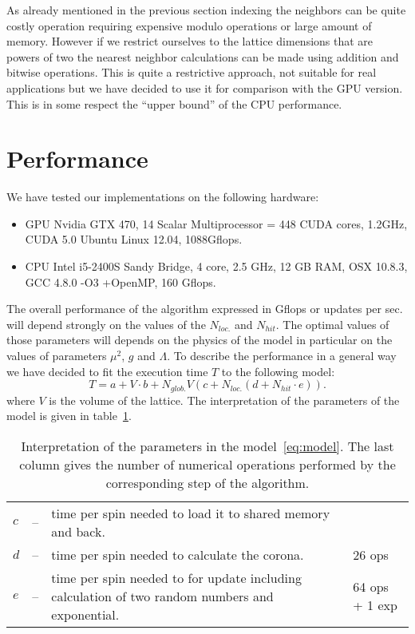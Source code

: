 \documentclass[a4paper]{llncs}
\begin{document}
As already mentioned in the previous section indexing the neighbors
can be quite costly operation requiring expensive modulo
operations or large amount of memory. However if
we restrict ourselves to the lattice dimensions that are powers of two
the nearest neighbor calculations can be made using addition and bitwise
operations. This is quite a restrictive approach, not suitable
for real applications but we have decided to use it for comparison
with the GPU version. This is in some respect the ``upper bound'' of
the CPU performance.


\section{Performance}
\label{sec:performance}

We have tested our implementations on  the following hardware:
\begin{itemize}
\item GPU Nvidia GTX 470, 14 Scalar Multiprocessor = 448 CUDA cores, 1.2GHz, CUDA 5.0 Ubuntu Linux 12.04, 1088Gflops.
\item CPU Intel i5-2400S Sandy Bridge, 4 core, 2.5 GHz, 12 GB RAM, OSX 10.8.3, GCC 4.8.0 -O3 +OpenMP, 160 Gflops. 
\end{itemize}

The overall performance of the algorithm expressed in Gflops or
updates per sec. will depend strongly on the values of the $N_{loc.}$
and $N_{hit}$. The optimal values of those parameters will depends on
the physics of the model in particular on the values of parameters
$\mu^2$, $g$ and $\Lambda$. To describe the performance in a general
way we have decided to fit the execution time $T$ to the following
model:
\begin{equation}\label{eq:model}
T  = a+ V \cdot b +
N_{glob.} V \left(c + N_{loc.}\left(d + N_{hit}\cdot e\right)\right) . 
\end{equation}
where $V$ is the volume of the lattice.  The interpretation of the
parameters of the model is given in table~\ref{tab:pars-int}.

\begin{table}
\begin{center} \begin{tabular}{lcp{8cm}p{2cm}}
$c$ &--& time per spin needed to load it to shared memory and back.&\\
$d$ &--& time per spin needed to calculate the corona.& 26 ops\\
$e$ &--& time per spin needed to for update including calculation of two
random numbers and exponential. & 64 ops + 1 exp
\end{tabular}
\end{center}
\caption{\label{tab:pars-int}Interpretation of the parameters in the
model~\ref{eq:model}. The last column gives the number of numerical operations
performed by the corresponding step of the algorithm.}
\end{table}
\end{document}
